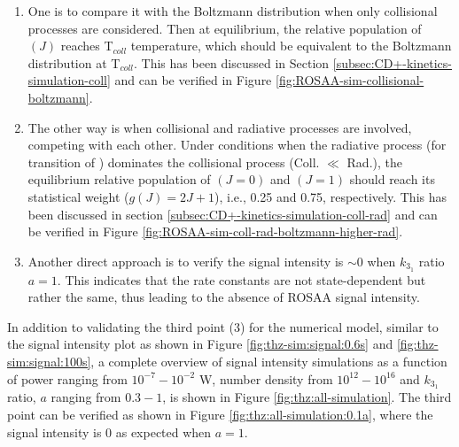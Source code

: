 \begin{enumerate}
    \item  One is to compare it with the Boltzmann distribution when only collisional
          processes are considered. Then at equilibrium, the relative population of
          \CD$(J)$ reaches T$_{coll}$ temperature, which should be equivalent to the
          Boltzmann distribution at T$_{coll}$. This has been discussed in Section
          \ref{subsec:CD+-kinetics-simulation-coll} and can be verified in Figure
          \ref{fig:ROSAA-sim-collisional-boltzmann}.
    \item The other way is when collisional and radiative processes are involved,
          competing with each other. Under conditions when the radiative process (for
          \CDline transition of \CD) dominates the collisional process (Coll. $\ll$
          Rad.), the equilibrium relative population of \CD$(J=0)$ and \CD$(J=1)$ should
          reach its statistical weight ($g(J) = 2J+1$), i.e., 0.25 and 0.75,
          respectively. This has been discussed in section
          \ref{subsec:CD+-kinetics-simulation-coll-rad} and can be verified in Figure
          \ref{fig:ROSAA-sim-coll-rad-boltzmann-higher-rad}.
    \item Another direct approach is to verify the signal intensity is $\sim 0$ when
          $k_{3_1}$ ratio $a=1$. This indicates that the rate constants are not
          state-dependent but rather the same, thus leading to the absence of ROSAA
          signal intensity.
\end{enumerate}

In addition to validating the third point (3) for the numerical model, similar
to the signal intensity plot as shown in Figure \ref{fig:thz-sim:signal:0.6s}
and \ref{fig:thz-sim:signal:100s}, a complete overview of signal intensity
simulations as a function of power ranging from $10^{-7}-10^{-2}$ W, number
density from $10^{12}-10^{16}$ \percc and $k_{3_1}$ ratio, $a$ ranging from
$0.3-1$, is shown in Figure \ref{fig:thz:all-simulation}. The third point can
be verified as shown in Figure \ref{fig:thz:all-simulation:0.1a}, where the
signal intensity is 0 as expected when $a=1$.\\

